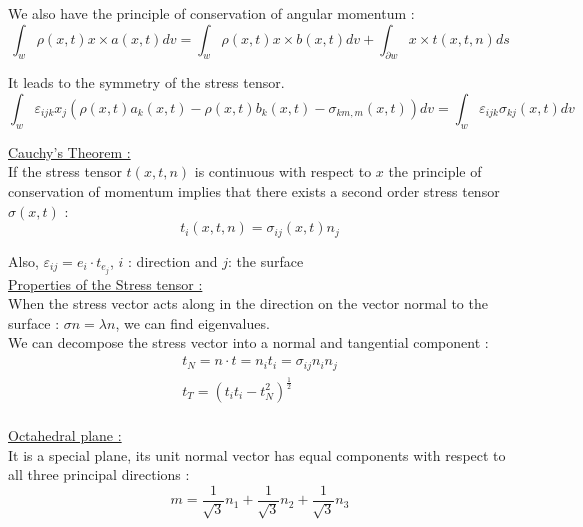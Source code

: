 \documentclass[../main.tex]{subfiles}
\begin{document}
We also have the principle of conservation of angular momentum : \begin{equation}
    \int_w \rho(x,t) x \times a(x,t)dv = \int_w \rho(x,t) x \times b(x,t)dv + \int_{\partial w} x\times t(x,t,n)ds
\end{equation}

It leads to the symmetry of the stress tensor.\\

\begin{equation}
    \int_w \varepsilon_{ijk} x_j(\rho(x,t) a_k(x,t) - \rho(x,t) b_k(x,t) - \sigma_{km,m}(x,t))dv = \int_w \varepsilon_{ijk} \sigma_{kj}(x,t) dv
\end{equation}

\quad \underline{Cauchy's Theorem :}\\
If the stress tensor $t(x,t,n)$ is continuous with respect to $x$ the principle of conservation of momentum implies that there exists a second order stress tensor $\sigma(x,t)$ : \begin{equation}
    t_i(x,t,n) = \sigma_{ij}(x,t) n_j
\end{equation}

Also, $\varepsilon_{ij} = e_i \cdot t_{e_j}$, $i$ : direction and $j$: the surface\\

\quad \underline{Properties of the Stress tensor :}\\
When the stress vector acts along in the direction on the vector normal to the surface : $\sigma n = \lambda n$, we can find eigenvalues.\\

We can decompose the stress vector into a normal and tangential component : \begin{equation}
    \begin{gathered}
        t_N = n \cdot t = n_it_i = \sigma_{ij}n_in_j\\
        t_T = (t_it_i-t_N^2)^{\frac{1}{2}}\\
    \end{gathered}
\end{equation}

\quad \underline{Octahedral plane :}\\
It is a special plane, its unit normal vector has equal components with respect to all three principal directions : \begin{equation}
    m = \frac{1}{\sqrt{3}} n_1 + \frac{1}{\sqrt{3}} n_2 + \frac{1}{\sqrt{3}} n_3
\end{equation}
\end{document}
